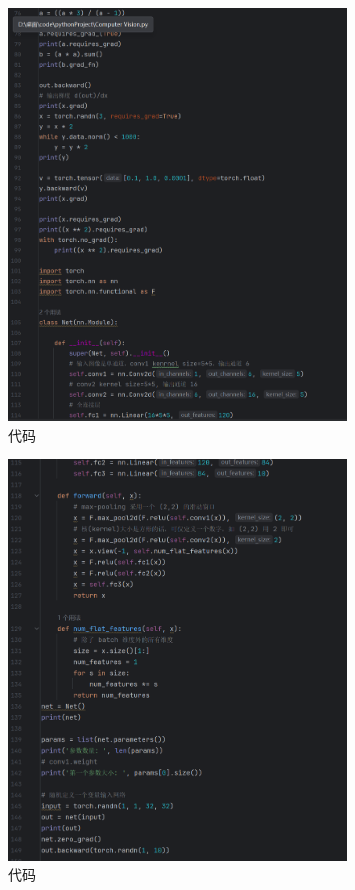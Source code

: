 \documentclass{article}
\begin{document}
\begin{figure}[htbp]
\centering
\includegraphics[width=0.8\textwidth]{3.png}
\caption{代码}
\end{figure}

\begin{figure}[htbp]
\centering
\includegraphics[width=0.8\textwidth]{4.png}
\caption{代码}
\end{figure}
\end{document}
